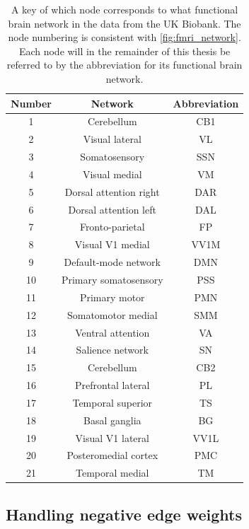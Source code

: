 \begin{table}[H]
    \centering
    \caption{A key of which node corresponds to what functional brain network in the data from the UK Biobank. The node numbering is consistent with \cref{fig:fmri_network}. Each node will in the remainder of this thesis be referred to by the abbreviation for its functional brain network.}
    \begin{tabular}{||c|c|c||}
        \hline
        Number & Network & Abbreviation  \\ \hline\hline
        1 & Cerebellum & CB1 \\ \hline
        2 & Visual lateral & VL  \\ \hline
        3 & Somatosensory & SSN \\ \hline
        4 & Visual medial &  VM\\ \hline
        5 & Dorsal attention right & DAR \\ \hline
        6 & Dorsal attention left &  DAL \\ \hline
        7 & Fronto-parietal &  FP\\ \hline
        8 & Visual V1 medial & VV1M \\ \hline
        9 & Default-mode network &  DMN \\ \hline
        10 & Primary somatosensory & PSS \\ \hline
        11 & Primary motor & PMN \\ \hline
        12 & Somatomotor medial & SMM  \\ \hline
        13 & Ventral attention &  VA\\ \hline
        14 & Salience network&  SN\\ \hline
        15 & Cerebellum & CB2 \\ \hline
        16 & Prefrontal lateral & PL \\ \hline
        17 & Temporal superior & TS \\ \hline
        18 & Basal ganglia &  BG \\ \hline
        19 & Visual V1 lateral & VV1L \\ \hline
        20 & Posteromedial cortex & PMC \\ \hline
        21 & Temporal medial & TM \\ \hline
    \end{tabular}
    \label{tab:Networks}
\end{table}


\subsection{Handling negative edge weights}

